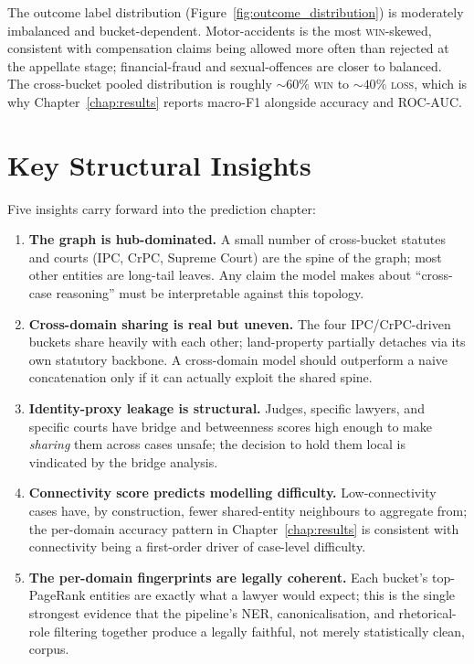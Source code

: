 The outcome label distribution (Figure~\ref{fig:outcome_distribution})
is moderately imbalanced and bucket-dependent. Motor-accidents is the
most \textsc{win}-skewed, consistent with compensation claims being
allowed more often than rejected at the appellate stage;
financial-fraud and sexual-offences are closer to balanced. The
cross-bucket pooled distribution is roughly $\sim\!60\%$ \textsc{win}
to $\sim\!40\%$ \textsc{loss}, which is why
Chapter~\ref{chap:results} reports macro-F1 alongside accuracy and
ROC-AUC.

\section{Key Structural Insights}
\label{sec:key_insights}

Five insights carry forward into the prediction chapter:

\begin{enumerate}
  \item \textbf{The graph is hub-dominated.} A small number of
    cross-bucket statutes and courts (IPC, CrPC, Supreme Court) are
    the spine of the graph; most other entities are long-tail leaves.
    Any claim the model makes about ``cross-case reasoning'' must be
    interpretable against this topology.
  \item \textbf{Cross-domain sharing is real but uneven.} The four
    IPC/CrPC-driven buckets share heavily with each other; land-property
    partially detaches via its own statutory backbone. A cross-domain
    model should outperform a naive concatenation only if it can
    actually exploit the shared spine.
  \item \textbf{Identity-proxy leakage is structural.} Judges,
    specific lawyers, and specific courts have bridge and betweenness
    scores high enough to make \emph{sharing} them across cases
    unsafe; the decision to hold them local is vindicated by the
    bridge analysis.
  \item \textbf{Connectivity score predicts modelling difficulty.}
    Low-connectivity cases have, by construction, fewer shared-entity
    neighbours to aggregate from; the per-domain accuracy pattern in
    Chapter~\ref{chap:results} is consistent with connectivity being a
    first-order driver of case-level difficulty.
  \item \textbf{The per-domain fingerprints are legally coherent.}
    Each bucket's top-PageRank entities are exactly what a lawyer
    would expect; this is the single strongest evidence that the
    pipeline's NER, canonicalisation, and rhetorical-role filtering
    together produce a legally faithful, not merely statistically
    clean, corpus.
\end{enumerate}
